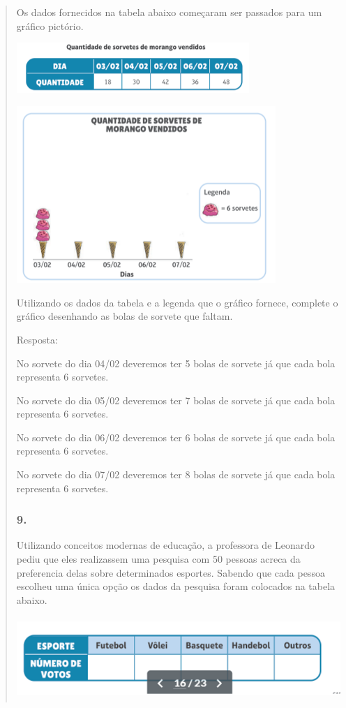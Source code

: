 \begin{enumerate}
\begin{escolha}
\begin{enumerate}
\begin{itemize}
\begin{itemize}
\begin{escolha}
\begin{quote}
\begin{escolha}
{Os dados fornecidos na tabela abaixo começaram ser passados para um
gráfico pictório.

\includegraphics[width=3.47436in,height=0.75022in]{media/image100.png}

\includegraphics[width=3.86538in,height=2.63899in]{media/image101.png}

Utilizando os dados da tabela e a legenda que o gráfico fornece,
complete o gráfico desenhando as bolas de sorvete que faltam.

Resposta:

No sorvete do dia 04/02 deveremos ter 5 bolas de sorvete já que cada
bola representa 6 sorvetes.

No sorvete do dia 05/02 deveremos ter 7 bolas de sorvete já que cada
bola representa 6 sorvetes.

No sorvete do dia 06/02 deveremos ter 6 bolas de sorvete já que cada
bola representa 6 sorvetes.

No sorvete do dia 07/02 deveremos ter 8 bolas de sorvete já que cada
bola representa 6 sorvetes.

\subsubsection{9.}\label{section-99}

Utilizando conceitos modernas de educação, a professora de Leonardo
pediu que eles realizassem uma pesquisa com 50 pessoas acreca da
preferencia delas sobre determinados esportes. Sabendo que cada pessoa
escolheu uma única opção os dados da pesquisa foram colocados na tabela
abaixo.

\includegraphics[width=5.39213in,height=1.22511in]{media/image102.png}

}
\end{escolha}
\end{quote}
\end{escolha}
\end{itemize}
\end{itemize}
\end{enumerate}
\end{escolha}
\end{enumerate}
